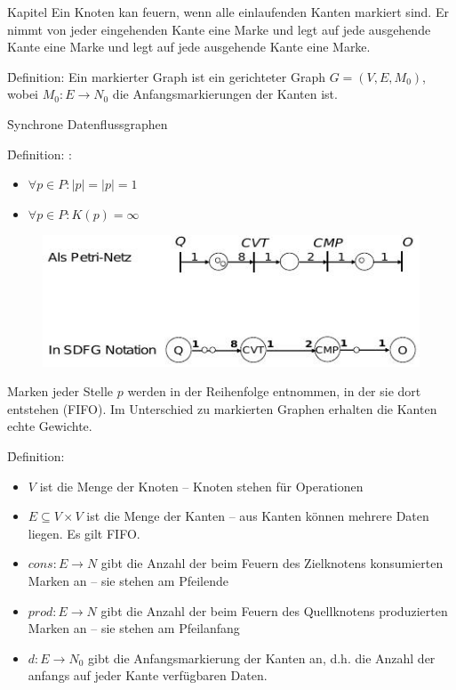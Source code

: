 \begin{chapter}{Kapitel}
Ein Knoten kan feuern, wenn alle einlaufenden Kanten markiert sind. Er nimmt von jeder eingehenden Kante eine Marke und legt auf jede ausgehende Kante eine Marke 
und legt auf jede ausgehende Kante eine Marke. 

\noindent \f{Definition}: Ein markierter Graph ist ein gerichteter Graph $G=(V,E,M_0)$, wobei $M_0:E\rightarrow N_0$ die Anfangsmarkierungen der Kanten ist. 
\vspace*{6pt}

\f{Synchrone Datenflussgraphen}
\vspace*{3pt}

\noindent \f{Definition}: :
\begin{itemize}
 \item $\forall p\in P: |$\textbullet$p| = |p$\textbullet$| = 1$
 \item $\forall p\in P:K(p)=\infty$
\end{itemize}
\begin{figure}[!ht]
 \centering
 \includegraphics[scale=0.8]{pics/sdfg}
\end{figure}
\newpage
\noindent Marken jeder Stelle $p$ werden in der Reihenfolge entnommen, in der sie dort entstehen (FIFO). Im Unterschied zu markierten Graphen erhalten die Kanten echte 
Gewichte.

\f{Definition}: 
\begin{itemize}
 \item $V$ ist die Menge der Knoten -- Knoten stehen für Operationen
 \item $E\subseteq V\times V$ ist die Menge der Kanten -- aus Kanten können mehrere Daten liegen. Es gilt FIFO.
 \item $cons:E\rightarrow N$ gibt die Anzahl der beim Feuern des Zielknotens konsumierten Marken an -- sie stehen am Pfeilende
 \item $prod:E\rightarrow N$ gibt die Anzahl der beim Feuern des Quellknotens produzierten Marken an -- sie stehen am Pfeilanfang
 \item $d:E\rightarrow N_0$ gibt die Anfangsmarkierung der Kanten an, d.h. die Anzahl der anfangs auf jeder Kante verfügbaren Daten. 
\end{itemize}


\end{chapter}
